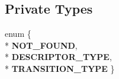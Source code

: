 \subsection*{Private Types}
\begin{DoxyCompactItemize}
\item 
enum \{ \\*
{\bfseries N\+O\+T\+\_\+\+F\+O\+U\+ND}, 
\\*
{\bfseries D\+E\+S\+C\+R\+I\+P\+T\+O\+R\+\_\+\+T\+Y\+PE}, 
\\*
{\bfseries T\+R\+A\+N\+S\+I\+T\+I\+O\+N\+\_\+\+T\+Y\+PE}
 \}\hypertarget{classv8_1_1internal_1_1_h_optimized_graph_builder_1_1_property_access_info_acee6e8b5b81cd3aea04c02ed8893e473}{}\label{classv8_1_1internal_1_1_h_optimized_graph_builder_1_1_property_access_info_acee6e8b5b81cd3aea04c02ed8893e473}

\end{DoxyCompactItemize}
